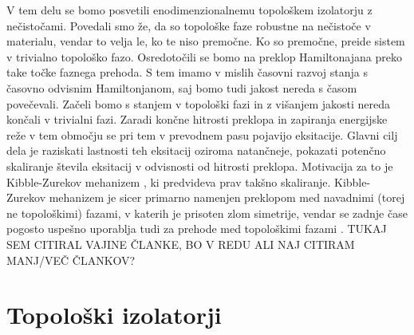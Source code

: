 V tem delu se bomo posvetili enodimenzionalnemu topološkem izolatorju z nečistočami. Povedali smo že, da so topološke faze robustne na nečistoče v materialu, vendar to velja le, ko te niso premočne. Ko so premočne, preide sistem v trivialno topološko fazo.
Osredotočili se bomo na preklop Hamiltonajana preko take točke faznega prehoda. S tem imamo v mislih časovni razvoj stanja s časovno odvisnim Hamiltonjanom, saj bomo tudi jakost nereda s časom povečevali. Začeli bomo s stanjem v topološki fazi in z višanjem jakosti nereda končali v trivialni fazi. Zaradi končne hitrosti preklopa in zapiranja energijske reže v tem območju se pri tem v prevodnem pasu pojavijo eksitacije. Glavni cilj dela je raziskati lastnosti teh eksitacij oziroma natančneje, pokazati potenčno skaliranje števila eksitacij v odvisnosti od hitrosti preklopa. Motivacija za to je Kibble-Zurekov mehanizem \cite{kibble}, ki predvideva prav takšno skaliranje. Kibble-Zurekov mehanizem je sicer primarno namenjen preklopom med navadnimi (torej ne topološkimi) fazami, v katerih je prisoten zlom simetrije, vendar se zadnje čase pogosto uspešno uporablja tudi za prehode med topološkimi fazami \cite{lara1,lara2,lara3}. TUKAJ SEM CITIRAL VAJINE ČLANKE, BO V REDU ALI NAJ CITIRAM MANJ/VEČ ČLANKOV?   
\chapter{Topološki izolatorji}
\label{chMa}

